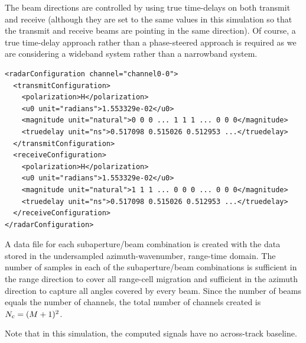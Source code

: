 \par
The beam directions are controlled by using true time-delays on both transmit and receive (although they are set to the same values in this simulation so that the transmit and receive beams are pointing in the same direction). Of course, a true time-delay approach rather than a phase-steered approach is required as we are considering a wideband system rather than a narrowband system.
\begin{lstlisting}[caption={Channel/Beam configuration}, label={lst:configuration}]
<radarConfiguration channel="channel0-0">
  <transmitConfiguration>
    <polarization>H</polarization>
    <u0 unit="radians">1.553329e-02</u0>
    <magnitude unit="natural">0 0 0 ... 1 1 1 ... 0 0 0</magnitude>
    <truedelay unit="ns">0.517098 0.515026 0.512953 ...</truedelay>
  </transmitConfiguration>
  <receiveConfiguration>
    <polarization>H</polarization>
    <u0 unit="radians">1.553329e-02</u0>
    <magnitude unit="natural">1 1 1 ... 0 0 0 ... 0 0 0</magnitude>
    <truedelay unit="ns">0.517098 0.515026 0.512953 ...</truedelay>
  </receiveConfiguration>
</radarConfiguration>
\end{lstlisting}
A data file for each subaperture/beam combination is created with the data stored in the undersampled azimuth-wavenumber, range-time domain. The number of samples in each of the subaperture/beam combinations is sufficient in the range direction to cover all range-cell migration and sufficient in the azimuth direction to capture all angles covered by every beam. Since the number of beams equals the number of channels, the total number of channels created is $N_c = (M+1)^2$.
\par
Note that in this simulation, the computed signals have no across-track baseline.
